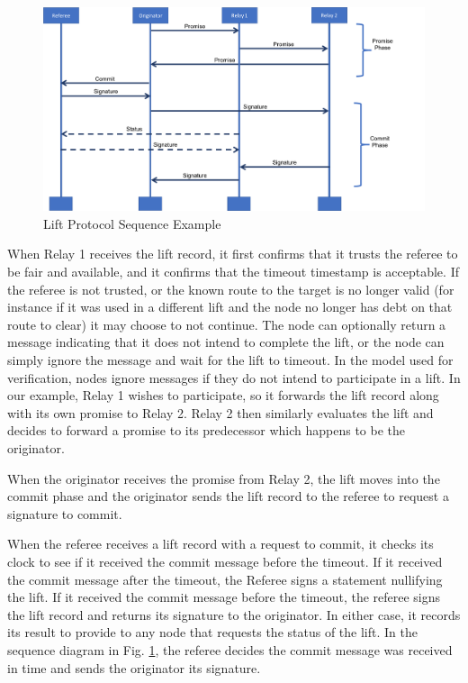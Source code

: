 \documentclass[runningheads]{llncs}
\begin{document}
\begin{figure}
    \centering
    \includegraphics[scale=0.35]{SequenceDiagramLifeline.png}
    \caption{Lift Protocol Sequence Example}
    \label{fig:liftSequence}
\end{figure}

When Relay 1 receives the lift record, it first confirms that it trusts the referee to be fair and available, and it confirms that the timeout timestamp is acceptable. If the referee is not trusted, or the known route to the target is no longer valid (for instance if it was used in a different lift and the node no longer has debt on that route to clear) it may choose to not continue. The node can optionally return a message indicating that it does not intend to complete the lift, or the node can simply ignore the message and wait for the lift to timeout. In the model used for verification, nodes ignore messages if they do not intend to participate in a lift. In our example, Relay 1 wishes to participate, so it forwards the lift record along with its own promise to Relay 2. Relay 2 then similarly evaluates the lift and decides to forward a promise to its predecessor which happens to be the originator. 

When the originator receives the promise from Relay 2, the lift moves into the commit phase and the originator sends the lift record to the referee to request a signature to commit. 

When the referee receives a lift record with a request to commit, it checks its clock to see if it received the commit message before the timeout. If it received the commit message after the timeout, the Referee signs a statement nullifying the lift. If it received the commit message before the timeout, the referee signs the lift record and returns its signature to the originator. In either case, it records its result to provide to any node that requests the status of the lift. In the sequence diagram in Fig. \ref{fig:liftSequence}, the referee decides the commit message was received in time and sends the originator its signature.
\end{document}

